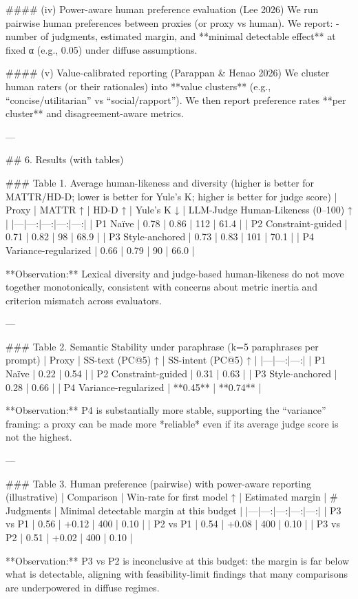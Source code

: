 #### (iv) Power-aware human preference evaluation (Lee 2026)  
We run pairwise human preferences between proxies (or proxy vs human). We report:
- number of judgments, estimated margin, and **minimal detectable effect** at fixed α (e.g., 0.05) under diffuse assumptions.

#### (v) Value-calibrated reporting (Parappan & Henao 2026)  
We cluster human raters (or their rationales) into **value clusters** (e.g., “concise/utilitarian” vs “social/rapport”). We then report preference rates **per cluster** and disagreement-aware metrics.

---

## 6. Results (with tables)  

### Table 1. Average human-likeness and diversity (higher is better for MATTR/HD-D; lower is better for Yule’s K; higher is better for judge score)  
| Proxy | MATTR ↑ | HD-D ↑ | Yule’s K ↓ | LLM-Judge Human-Likeness (0–100) ↑ |
|---|---:|---:|---:|---:|
| P1 Naïve | 0.78 | 0.86 | 112 | 61.4 |
| P2 Constraint-guided | 0.71 | 0.82 | 98 | 68.9 |
| P3 Style-anchored | 0.73 | 0.83 | 101 | 70.1 |
| P4 Variance-regularized | 0.66 | 0.79 | 90 | 66.0 |

**Observation:** Lexical diversity and judge-based human-likeness do not move together monotonically, consistent with concerns about metric inertia and criterion mismatch across evaluators.

---

### Table 2. Semantic Stability under paraphrase (k=5 paraphrases per prompt)  
| Proxy | SS-text (PC@5) ↑ | SS-intent (PC@5) ↑ |
|---|---:|---:|
| P1 Naïve | 0.22 | 0.54 |
| P2 Constraint-guided | 0.31 | 0.63 |
| P3 Style-anchored | 0.28 | 0.66 |
| P4 Variance-regularized | **0.45** | **0.74** |

**Observation:** P4 is substantially more stable, supporting the “variance” framing: a proxy can be made more *reliable* even if its average judge score is not the highest.

---

### Table 3. Human preference (pairwise) with power-aware reporting (illustrative)  
| Comparison | Win-rate for first model ↑ | Estimated margin | # Judgments | Minimal detectable margin at this budget |
|---|---:|---:|---:|---:|
| P3 vs P1 | 0.56 | +0.12 | 400 | 0.10 |
| P2 vs P1 | 0.54 | +0.08 | 400 | 0.10 |
| P3 vs P2 | 0.51 | +0.02 | 400 | 0.10 |

**Observation:** P3 vs P2 is inconclusive at this budget: the margin is far below what is detectable, aligning with feasibility-limit findings that many comparisons are underpowered in diffuse regimes.

